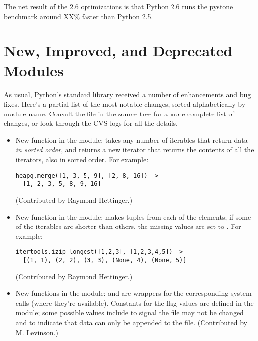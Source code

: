 \documentclass{howto}
\begin{document}
The net result of the 2.6 optimizations is that Python 2.6 runs the
pystone benchmark around XX\% faster than Python 2.5.


\section{New, Improved, and Deprecated Modules}

As usual, Python's standard library received a number of enhancements and
bug fixes.  Here's a partial list of the most notable changes, sorted
alphabetically by module name. Consult the
 file in the source tree for a more
complete list of changes, or look through the CVS logs for all the
details.

\begin{itemize}

\item New function in the  module:
takes any number of iterables that return data 
\emph{in sorted order}, 
and 
returns a new iterator that returns the contents of
all the iterators, also in sorted order.  For example:

\begin{verbatim}
heapq.merge([1, 3, 5, 9], [2, 8, 16]) ->
  [1, 2, 3, 5, 8, 9, 16]
\end{verbatim}

(Contributed by Raymond Hettinger.)

\item New function in the  module:
makes tuples from each of the elements; if some of the iterables
are shorter than others, the missing values 
are set to .  For example:

\begin{verbatim}
itertools.izip_longest([1,2,3], [1,2,3,4,5]) ->
  [(1, 1), (2, 2), (3, 3), (None, 4), (None, 5)]
\end{verbatim}

(Contributed by Raymond Hettinger.)

\item New functions in the  module: 
and  are wrappers for the corresponding system
calls (where they're available).  Constants for the flag values are
defined in the  module; some possible values include
 to signal the file may not be changed and
 to indicate that data can only be appended to the
file.  (Contributed by M. Levinson.)


\end{itemize}
\end{document}
